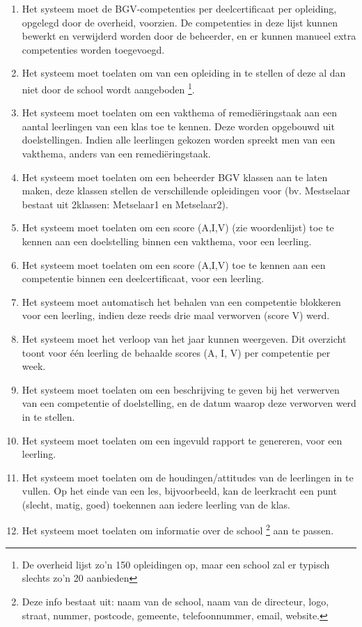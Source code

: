 \documentclass[a4paper]{article}
\begin{document}
\begin{enumerate}[label=F\arabic*]
\item Het systeem moet de BGV-competenties per deelcertificaat per opleiding, opgelegd door de overheid, voorzien. De competenties in deze lijst kunnen bewerkt en verwijderd worden door de beheerder, en er kunnen manueel extra competenties worden toegevoegd.
\item Het systeem moet toelaten om van een opleiding in te stellen of deze al dan niet door de school wordt aangeboden \footnote{De overheid lijst zo'n 150 opleidingen op, maar een school zal er typisch slechts zo'n 20 aanbieden}.
\item Het systeem moet toelaten om een vakthema of remediëringstaak aan een aantal leerlingen van een klas toe te kennen. Deze worden opgebouwd uit doelstellingen. Indien alle leerlingen gekozen worden spreekt men van een vakthema, anders van een remediëringstaak.
\item Het systeem moet toelaten om een beheerder BGV klassen aan te laten maken, deze klassen stellen de verschillende opleidingen voor (bv. Mestselaar bestaat uit 2klassen: Metselaar1 en Metselaar2).
\item Het systeem moet toelaten om een score (A,I,V) (zie woordenlijst) toe te kennen aan een doelstelling binnen een vakthema, voor een leerling.  %
\item Het systeem moet toelaten om een score (A,I,V) toe te kennen aan een competentie binnen een deelcertificaat, voor een leerling.  %
\item Het systeem moet automatisch het behalen van een competentie blokkeren voor een leerling, indien deze reeds drie maal verworven (score V) werd.  %
\item Het systeem moet het verloop van het jaar kunnen weergeven. Dit overzicht toont voor één leerling de behaalde scores (A, I, V) per competentie per week.
\item Het systeem moet toelaten om een beschrijving te geven bij het verwerven van een competentie of doelstelling, en de datum waarop deze verworven werd in te stellen.
\item Het systeem moet toelaten om een ingevuld rapport te genereren, voor een leerling.
\item Het systeem moet toelaten om de houdingen/attitudes van de leerlingen in te vullen. Op het einde van een les, bijvoorbeeld, kan de leerkracht een punt (slecht, matig, goed) toekennen aan iedere leerling van de klas.
\item Het systeem moet toelaten om informatie over de school \footnote{Deze info bestaat uit: naam van de school, naam van de directeur, logo, straat, nummer, postcode, gemeente, telefoonnummer, email, website.} aan te passen.

\end{enumerate}
\end{document}

